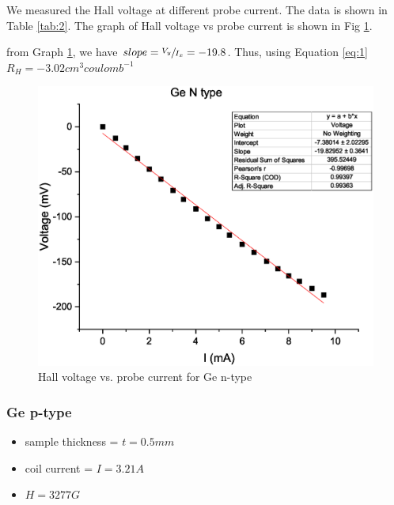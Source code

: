 			We measured the Hall voltage at different probe current. The data is shown in Table \ref{tab:2}. The graph of Hall voltage vs probe current is shown in Fig \ref{graph:2}.

			from Graph \ref{graph:2}, we have $slope=\sfrac{V_y}{I_x}=-19.8$. Thus, using Equation \ref{eq:1} $ R_H=-3.02 cm^3 coulomb^{-1}$

			
			\begin{figure}[h]
				\centering
				\includegraphics[width=0.9\columnwidth]{images/gen.eps}
				\caption{Hall voltage vs. probe current for Ge n-type}
				\label{graph:2}
			\end{figure}


		\subsubsection{Ge p-type}

			\begin{itemize}
				\item sample thickness = $t=0.5mm$
				\item coil current = $I=3.21A$
				\item $H=3277G$
			\end{itemize}
			

